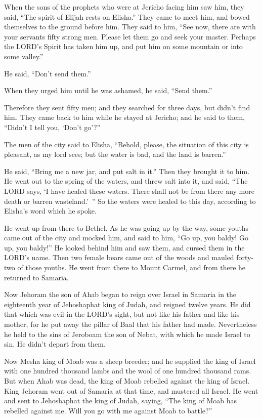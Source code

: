 \myverse{}When the sons of the prophets who were at Jericho facing him
saw him, they said, “The spirit of Elijah rests on Elisha.” They came to meet him, and bowed themselves
to the ground before him.
\myverse{}They said to him, “See now, there are with your servants fifty strong men.
Please let them go and seek your master. Perhaps the LORD’s Spirit has taken him up, and put him on some
mountain or into some valley.”

He said, “Don’t send them.”

\myverse{}When they urged him until he was ashamed, he said, “Send them.”

Therefore they sent fifty men; and they searched for three days, but didn’t find him.
\myverse{}They came back to him while he stayed at Jericho; and he said to them, “Didn’t
I tell you, ‘Don’t go’?”

\myverse{}The men of the city said to Elisha, “Behold, please, the situation
of this city is pleasant, as my lord sees; but the water is bad, and the land is barren.”

\myverse{}He said, “Bring me a new jar, and put salt in it.” Then they
brought it to him.
\myverse{}He went out to the spring of the waters, and threw salt into it, and said,
“The LORD says, ‘I have healed these waters. There shall not be from there any more death or barren wasteland.’ ”
\myverse{}So the waters were healed to this day, according to Elisha’s word which he
spoke.

\myverse{}He went up from there to Bethel. As he was going up by the way,
some youths came out of the city and mocked him, and said to him, “Go up, you baldy! Go up, you baldy!”
\myverse{}He looked behind him and saw them, and cursed them in the LORD’s name. Then
two female bears came out of the woods and mauled forty-two of those youths.
\myverse{}He went from there to Mount Carmel, and from there he returned to Samaria.


\mychapter{} \myverse*{}Now Jehoram the son of Ahab began to reign over Israel in Samaria
in the eighteenth year of Jehoshaphat king of Judah, and reigned twelve years.
\myverse{}He did that which was evil in the LORD’s sight, but not like his father and
like his mother, for he put away the pillar of Baal that his father had made.
\myverse{}Nevertheless he held to the sins of Jeroboam the son of Nebat, with which he
made Israel to sin. He didn’t depart from them.

\myverse{}Now Mesha king of Moab was a sheep breeder; and he supplied the
king of Israel with one hundred thousand lambs and the wool of one hundred thousand rams.
\myverse{}But when Ahab was dead, the king of Moab rebelled against the king of Israel.
\myverse{}King Jehoram went out of Samaria at that time, and mustered all Israel.
\myverse{}He went and sent to Jehoshaphat the king of Judah, saying, “The king of Moab
has rebelled against me. Will you go with me against Moab to battle?”

